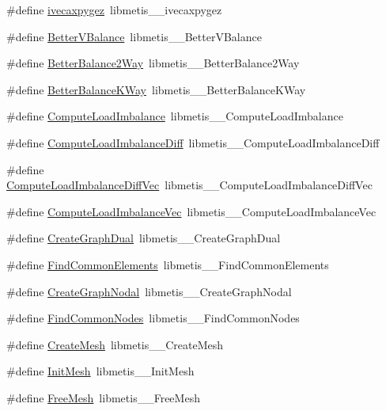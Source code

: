 \begin{DoxyCompactItemize}
\item 
\#define \hyperlink{a00957_ac9df70b7c950f200fa25113d91ecb07c}{ivecaxpygez}~libmetis\+\_\+\+\_\+ivecaxpygez
\item 
\#define \hyperlink{a00957_a192db025e9c93809b1de0beb80aadbbd}{Better\+V\+Balance}~libmetis\+\_\+\+\_\+\+Better\+V\+Balance
\item 
\#define \hyperlink{a00957_a6196cb6e794d4642af961ea28b6f093c}{Better\+Balance2\+Way}~libmetis\+\_\+\+\_\+\+Better\+Balance2\+Way
\item 
\#define \hyperlink{a00957_aaaca5bb0a93ee43df87d061557f4a275}{Better\+Balance\+K\+Way}~libmetis\+\_\+\+\_\+\+Better\+Balance\+K\+Way
\item 
\#define \hyperlink{a00957_a8d9fc82f8a62f74bd5f2feeda3942d89}{Compute\+Load\+Imbalance}~libmetis\+\_\+\+\_\+\+Compute\+Load\+Imbalance
\item 
\#define \hyperlink{a00957_a7fb8dd6f6e21f8457d14bec179f033b9}{Compute\+Load\+Imbalance\+Diff}~libmetis\+\_\+\+\_\+\+Compute\+Load\+Imbalance\+Diff
\item 
\#define \hyperlink{a00957_a08d20e7d3ea6a69d0a2fbccdb4686a40}{Compute\+Load\+Imbalance\+Diff\+Vec}~libmetis\+\_\+\+\_\+\+Compute\+Load\+Imbalance\+Diff\+Vec
\item 
\#define \hyperlink{a00957_aaa6e001866f87c274433bef9a5755e11}{Compute\+Load\+Imbalance\+Vec}~libmetis\+\_\+\+\_\+\+Compute\+Load\+Imbalance\+Vec
\item 
\#define \hyperlink{a00957_ade5416da2a0f4f8d94138762b027f9a6}{Create\+Graph\+Dual}~libmetis\+\_\+\+\_\+\+Create\+Graph\+Dual
\item 
\#define \hyperlink{a00957_ada39277b37d0c62049e0c6d1d447c41e}{Find\+Common\+Elements}~libmetis\+\_\+\+\_\+\+Find\+Common\+Elements
\item 
\#define \hyperlink{a00957_aac93d44ff80ae9bb7e0a90d7568d7d2e}{Create\+Graph\+Nodal}~libmetis\+\_\+\+\_\+\+Create\+Graph\+Nodal
\item 
\#define \hyperlink{a00957_a1e85d959a7a7ed557664426092598472}{Find\+Common\+Nodes}~libmetis\+\_\+\+\_\+\+Find\+Common\+Nodes
\item 
\#define \hyperlink{a00957_a95dc343080e795f30023259286bf433f}{Create\+Mesh}~libmetis\+\_\+\+\_\+\+Create\+Mesh
\item 
\#define \hyperlink{a00957_a692a40ec79439397410eb3d99f94a53d}{Init\+Mesh}~libmetis\+\_\+\+\_\+\+Init\+Mesh
\item 
\#define \hyperlink{a00957_ab0bd816c42d2346fa489c296712655c3}{Free\+Mesh}~libmetis\+\_\+\+\_\+\+Free\+Mesh

\end{DoxyCompactItemize}
